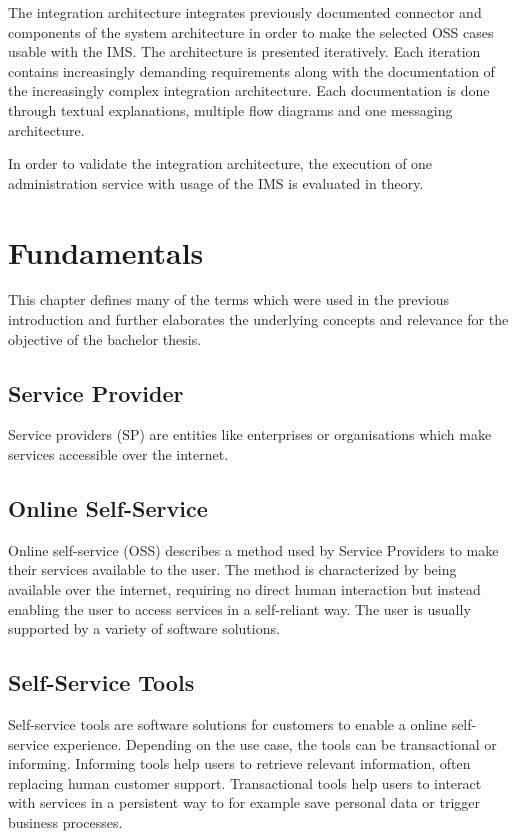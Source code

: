 \documentclass[
     12pt,         %
     a4paper,      %
     BCOR=10mm,version=first,     %
     DIV=14,version=first,        %
     ]{scrreprt}
\begin{document}
The integration architecture integrates previously documented connector and components of the system architecture in order to make the selected OSS cases usable with the IMS. The architecture is presented iteratively. Each iteration contains increasingly demanding requirements along with the documentation of the increasingly complex integration architecture. Each documentation is done through textual explanations, multiple flow diagrams and one messaging architecture.

In order to validate the integration architecture, the execution of one administration service with usage of the IMS is evaluated in theory.

\chapter{Fundamentals}

This chapter defines many of the terms which were used in the previous introduction and further elaborates the underlying concepts and relevance for the objective of the bachelor thesis.

\section{Service Provider}
Service providers (SP) are entities like enterprises or organisations which make services accessible over the internet.

\section{Online Self-Service}
Online self-service (OSS) describes a method used by Service Providers to make their services available to the user. The method is characterized by being available over the internet, requiring no direct human interaction but instead enabling the user to access services in a self-reliant way. The user is usually supported by a variety of software solutions.

\section{Self-Service Tools}
Self-service tools are software solutions for customers to enable a online self-service experience. Depending on the use case, the tools can be transactional or informing. Informing tools help users to retrieve relevant information, often replacing human customer support. Transactional tools help users to interact with services in a persistent way to for example save personal data or trigger business processes.
\end{document}
